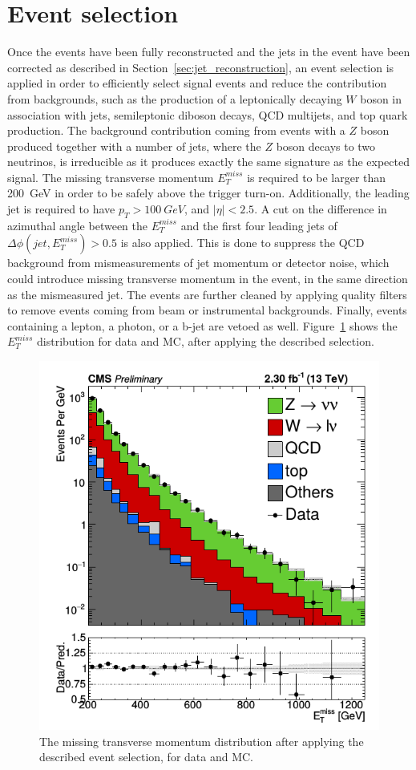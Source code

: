 \section{Event selection}
\label{sec:selection}

Once the events have been fully reconstructed and the jets in the event have been corrected as described in Section~\ref{sec:jet_reconstruction}, an event selection is applied in order to efficiently select signal events and reduce the contribution from backgrounds, such as the production of a leptonically decaying $W$ boson in association with jets, semileptonic diboson decays, QCD multijets, and top quark production. The background contribution coming from events with a $Z$ boson produced together with a number of jets, where the $Z$ boson decays to two neutrinos, is irreducible as it produces exactly the same signature as the expected signal. The missing transverse momentum $E_T^{miss}$ is required to be larger than \SI{200}{GeV} in order to be safely above the trigger turn-on. Additionally, the leading jet is required to have $p_T > \SI{100}{GeV}$, and $|\eta| < 2.5$. A cut on the difference in azimuthal angle between the $E_T^{miss}$ and the first four leading jets of $\Delta\phi(jet, E_T^{miss}) > 0.5$ is also applied. This is done to suppress the QCD background from mismeasurements of jet momentum or detector noise, which could introduce missing transverse momentum in the event, in the same direction as the mismeasured jet. The events are further cleaned by applying quality filters to remove events coming from beam or instrumental backgrounds. Finally, events containing a lepton, a photon, or a b-jet are vetoed as well. Figure~\ref{fig:MET} shows the $E_T^{miss}$ distribution for data and MC, after applying the described selection.

\begin{figure}[ht]
  \centering
 \includegraphics[width=.6\textwidth]{MET.png} 
 \caption{The missing transverse momentum distribution after applying the described event selection, for data and MC.}
 \label{fig:MET}
\end{figure}

